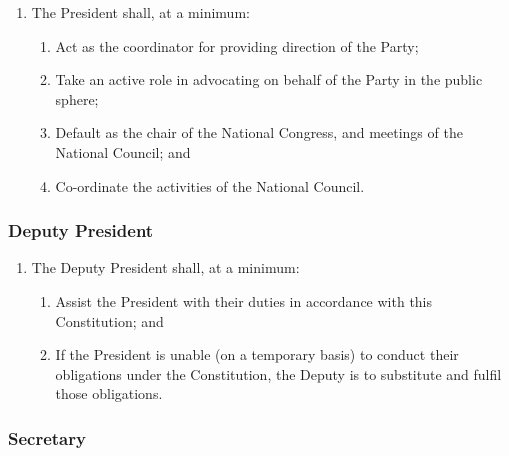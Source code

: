 \documentclass[a4paper,titlepage,8.5pt]{article}
\begin{document}
\begin{enumerate}
\item The President shall, at a minimum:
\begin{enumerate}
\item Act as the coordinator for providing direction of the Party;
\item Take an active role in advocating on behalf of the Party in the public sphere;
\item Default as the chair of the National Congress, and meetings of the National Council; and
\item Co-ordinate the activities of the National Council.
\end{enumerate}
\end{enumerate}

\subsubsection{Deputy President}

\begin{enumerate}
\item The Deputy President shall, at a minimum:
\begin{enumerate}
\item Assist the President with their duties in accordance with this Constitution; and
\item If the President is unable (on a temporary basis) to conduct their obligations under the Constitution, the Deputy is to substitute and fulfil those obligations.
\end{enumerate}
\end{enumerate}

\subsubsection{Secretary}
\end{document}
